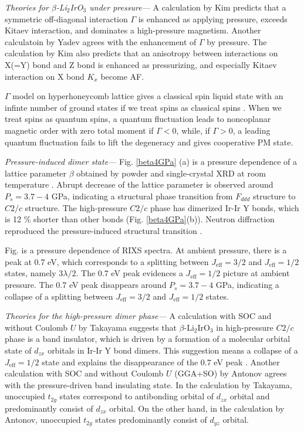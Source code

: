 \vspace{3mm}
\noindent\textit{Theories for $\beta$-Li$_2$IrO$_3$ under pressure---}
A calculation by Kim predicts that a symmetric off-diagonal interaction $\Gamma$ is enhanced as applying pressure, exceeds Kitaev interaction, and dominates a high-pressure magnetism.
Another calculatoin by Yadev agrees with the enhancement of $\Gamma$ by pressure.
The calculation by Kim also predicts that an anisotropy between interactions on X(=Y) bond and Z bond is enhanced as pressurizing, and especially Kitaev interaction on X bond $K_x$ become AF.

$\Gamma$ model on hyperhoneycomb lattice gives a classical spin liquid state with an infinte number of ground states if we treat spins as classical spins \cite{Rousochatzakis2017}.
When we treat spins as quantum spins, a quantum fluctuation leads to noncoplanar magnetic order with zero total moment if $\Gamma < 0$, while, if $\Gamma > 0$, a leading quantum fluctuation fails to lift the degeneracy and gives cooperative PM state.

\vspace{3mm}
\noindent\textit{Pressure-induced dimer state---}
Fig. \ref{beta4GPa} (a) is a pressure dependence of a lattice parameter $\beta$ obtained by powder and single-crystal XRD at room temperature \cite{veiga2017pressure}.
Abrupt decrease of the lattice parameter is observed around $P_s = 3.7-4$ GPa, indicating a structural phase transition from $F_{ddd}$ structure to $C2/c$ structure.
The high-pressure $C2/c$ phase has dimerized Ir-Ir Y bonds, which is 12 \% shorter than other bonds (Fig. \ref{beta4GPa}(b)).
Neutron diffraction reproduced the pressure-induced structural transition \cite{}.

Fig. is a pressure dependence of RIXS spectra.
At ambient pressure, there is a peak at 0.7 eV, which corresponds to a splitting between $J_{\mathrm{eff}} = 3/2$ and $J_{\mathrm{eff}} = 1/2$ states, namely $3\lambda/2$.
The 0.7 eV peak evidences a $J_\mathrm{eff} = 1/2$ picture at ambient pressure.
The 0.7 eV peak disappears around $P_s = 3.7-4$ GPa, indicating a collapse of a splitting between $J_{\mathrm{eff}} = 3/2$ and $J_{\mathrm{eff}} = 1/2$ states.

\vspace{3mm}
\noindent\textit{Theories for the high-pressure dimer phase---}
A calculation with SOC and without Coulomb $U$ by Takayama suggests that $\beta$-Li$_2$IrO$_3$ in high-pressure $C2/c$ phase is a band insulator, which is driven by a formation of a molecular orbital state of $d_{zx}$ orbitals in Ir-Ir Y bond dimers.
This suggestion means a collapse of a $J_{\mathrm{eff}} = 1/2$ state and explains the disappearance of the 0.7 eV peak \cite{}.
Another calculation with SOC and without Coulomb $U$ (GGA+SO) by Antonov agrees with the pressure-driven band insulating state.
In the calculation by Takayama, unoccupied $t_{2g}$ states correspond to antibonding orbital of $d_{zx}$ orbital and predominantly consist of $d_{zx}$ orbital.
On the other hand, in the calculation by Antonov, unoccupied $t_{2g}$ states predominantly consist of $d_{yz}$ orbital.

